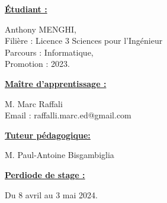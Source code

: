 \textbf{\underline{\Large Étudiant :}}
\begin{flushleft}
    \hspace{1cm} Anthony MENGHI, \\
    \hspace{1cm} Filière : Licence 3 Sciences pour l'Ingénieur \\
    \hspace{1cm} Parcours : Informatique, \\
    \hspace{1cm} Promotion : 2023. \\
\end{flushleft}
\vspace{0.8cm}
\textbf{\underline{\Large Maître d'apprentissage :}} 
\begin{flushleft}
    \hspace{1cm} M. Marc Raffali \\
    \hspace{1cm} Email : raffalli.marc.ed@gmail.com\\
\end{flushleft}
\vspace{0.8cm}

\textbf{\underline{\Large Tuteur pédagogique:}}  
\begin{flushleft}
    \hspace{1cm} M. Paul-Antoine Bisgambiglia \\
\end{flushleft}
\vspace{0.8cm}

\textbf{\underline{\Large Perdiode de stage :}}  
\begin{flushleft}
    \hspace{1cm} Du 8 avril au 3 mai 2024. \\
\end{flushleft}
